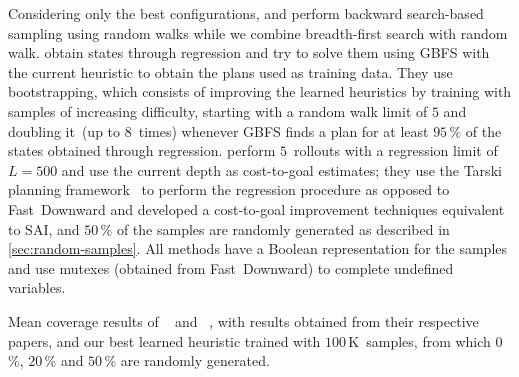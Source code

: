 Considering only the best configurations, \citet{ferber2022neural} and \citet{otoole2022sampling} perform backward search-based sampling using random walks while we combine breadth-first search with random walk. \citet{ferber2022neural} obtain states through regression and try to solve them using GBFS with the current heuristic to obtain the plans used as training data. They use bootstrapping, which consists of improving the learned heuristics by training with samples of increasing difficulty, starting with a random walk limit of $5$ and doubling it~(up to $8$~times) whenever GBFS finds a plan for at least $95\,\%$ of the states obtained through regression. \citet{otoole2022sampling} perform $5$~rollouts with a regression limit of $L=500$ and use the current depth as cost-to-goal estimates; they use the Tarski planning framework~\cite{tarski2018github} to perform the regression procedure as opposed to Fast~Downward and developed a cost-to-goal improvement techniques equivalent to SAI, and $50\,\%$ of the samples are randomly generated as described in \cref{sec:random-samples}. All methods have a Boolean representation for the samples and use mutexes (obtained from Fast~Downward) to complete undefined variables.

\begin{table}[tb]
    \caption[Mean coverage results of our approach compared to previous works.]{Mean coverage results of \hboot~\cite{ferber2022neural} and \hnrsl~\cite{otoole2022sampling}, with results obtained from their respective papers, and our best learned heuristic trained with $100$\,K~samples, from which $0$\,\%, $20$\,\% and $50$\,\% are randomly generated.}
    \label{tab:large-literature-comparison}
    \addmargin
    \centering
    
\end{table}

